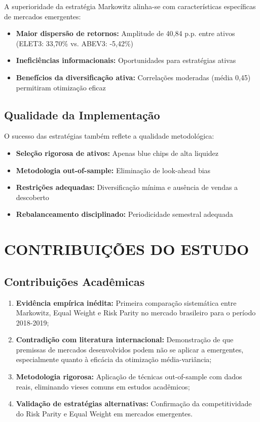 A superioridade da estratégia Markowitz alinha-se com características específicas de mercados emergentes:

\begin{itemize}
    \item \textbf{Maior dispersão de retornos:} Amplitude de 40,84 p.p. entre ativos (ELET3: 33,70\% vs. ABEV3: -5,42\%)
    \item \textbf{Ineficiências informacionais:} Oportunidades para estratégias ativas
    \item \textbf{Benefícios da diversificação ativa:} Correlações moderadas (média 0,45) permitiram otimização eficaz
\end{itemize}

\subsection{Qualidade da Implementação}

O sucesso das estratégias também reflete a qualidade metodológica:

\begin{itemize}
    \item \textbf{Seleção rigorosa de ativos:} Apenas blue chips de alta liquidez
    \item \textbf{Metodologia out-of-sample:} Eliminação de look-ahead bias
    \item \textbf{Restrições adequadas:} Diversificação mínima e ausência de vendas a descoberto
    \item \textbf{Rebalanceamento disciplinado:} Periodicidade semestral adequada
\end{itemize}

\section{CONTRIBUIÇÕES DO ESTUDO}

\subsection{Contribuições Acadêmicas}

\begin{enumerate}
    \item \textbf{Evidência empírica inédita:} Primeira comparação sistemática entre Markowitz, Equal Weight e Risk Parity no mercado brasileiro para o período 2018-2019;
    
    \item \textbf{Contradição com literatura internacional:} Demonstração de que premissas de mercados desenvolvidos podem não se aplicar a emergentes, especialmente quanto à eficácia da otimização média-variância;
    
    \item \textbf{Metodologia rigorosa:} Aplicação de técnicas out-of-sample com dados reais, eliminando vieses comuns em estudos acadêmicos;
    
    \item \textbf{Validação de estratégias alternativas:} Confirmação da competitividade do Risk Parity e Equal Weight em mercados emergentes.
\end{enumerate}

